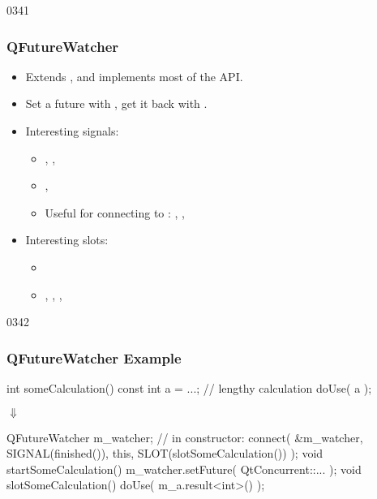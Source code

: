 \begin{slide}{0341}
\frametitle{QFutureWatcher}
\begin{itemize}
\item Extends , and implements most of the  API.
\item Set a future with , get it
  back with .
\item Interesting signals:
  \begin{itemize}
  \item%
    ,
    ,
  \item%
    ,

  \item Useful for connecting to :
    ,
    ,
  \end{itemize}
\item Interesting slots:
  \begin{itemize}
  \item %
  \item %
    ,
    ,
    ,
  \end{itemize}
\end{itemize}
\end{slide}



\begin{slide}[fragile]{0342}
\frametitle{QFutureWatcher Example}
\begin{center}\footnotesize
\begin{cpp}
int someCalculation() {
  const int a = ...; // lengthy calculation
  doUse( a );
}
\end{cpp}
{\Huge$\Downarrow$}
\begin{cpp}
QFutureWatcher m_watcher;
// in constructor:
connect( &m_watcher, SIGNAL(finished()),
         this, SLOT(slotSomeCalculation()) );
void startSomeCalculation() {
  m_watcher.setFuture( QtConcurrent::... );
}
void slotSomeCalculation() {
  doUse( m_a.result<int>() );
}
\end{cpp}
\end{center}
\end{slide}

